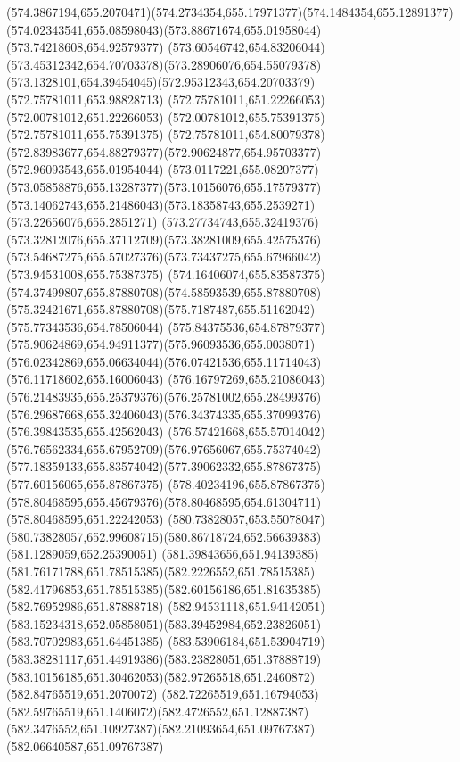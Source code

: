 {{	\curveto(574.3867194,655.2070471)(574.2734354,655.17971377)(574.1484354,655.12891377)
	\curveto(574.02343541,655.08598043)(573.88671674,655.01958044)(573.74218608,654.92579377)
	\curveto(573.60546742,654.83206044)(573.45312342,654.70703378)(573.28906076,654.55079378)
	\curveto(573.1328101,654.39454045)(572.95312343,654.20703379)(572.75781011,653.98828713)
	\lineto(572.75781011,651.22266053)
	\lineto(572.00781012,651.22266053)
	\lineto(572.00781012,655.75391375)
	\lineto(572.75781011,655.75391375)
	\lineto(572.75781011,654.80079378)
	\curveto(572.83983677,654.88279377)(572.90624877,654.95703377)(572.96093543,655.01954044)
	\curveto(573.0117221,655.08207377)(573.05858876,655.13287377)(573.10156076,655.17579377)
	\curveto(573.14062743,655.21486043)(573.18358743,655.2539271)(573.22656076,655.2851271)
	\curveto(573.27734743,655.32419376)(573.32812076,655.37112709)(573.38281009,655.42575376)
	\curveto(573.54687275,655.57027376)(573.73437275,655.67966042)(573.94531008,655.75387375)
	\curveto(574.16406074,655.83587375)(574.37499807,655.87880708)(574.58593539,655.87880708)
	\curveto(575.32421671,655.87880708)(575.7187487,655.51162042)(575.77343536,654.78506044)
	\curveto(575.84375536,654.87879377)(575.90624869,654.94911377)(575.96093536,655.0038071)
	\curveto(576.02342869,655.06634044)(576.07421536,655.11714043)(576.11718602,655.16006043)
	\curveto(576.16797269,655.21086043)(576.21483935,655.25379376)(576.25781002,655.28499376)
	\curveto(576.29687668,655.32406043)(576.34374335,655.37099376)(576.39843535,655.42562043)
	\curveto(576.57421668,655.57014042)(576.76562334,655.67952709)(576.97656067,655.75374042)
	\curveto(577.18359133,655.83574042)(577.39062332,655.87867375)(577.60156065,655.87867375)
	\curveto(578.40234196,655.87867375)(578.80468595,655.45679376)(578.80468595,654.61304711)
	\lineto(578.80468595,651.22242053)
	\closepath
	\moveto(580.73828057,653.55078047)
	\curveto(580.73828057,652.99608715)(580.86718724,652.56639383)(581.1289059,652.25390051)
	\curveto(581.39843656,651.94139385)(581.76171788,651.78515385)(582.2226552,651.78515385)
	\curveto(582.41796853,651.78515385)(582.60156186,651.81635385)(582.76952986,651.87888718)
	\curveto(582.94531118,651.94142051)(583.15234318,652.05858051)(583.39452984,652.23826051)
	\lineto(583.70702983,651.64451385)
	\curveto(583.53906184,651.53904719)(583.38281117,651.44919386)(583.23828051,651.37888719)
	\curveto(583.10156185,651.30462053)(582.97265518,651.2460872)(582.84765519,651.2070072)
	\curveto(582.72265519,651.16794053)(582.59765519,651.1406072)(582.4726552,651.12887387)
	\curveto(582.3476552,651.10927387)(582.21093654,651.09767387)(582.06640587,651.09767387)
}}
